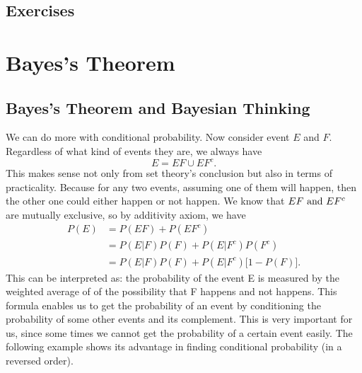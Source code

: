 	\subsection{Exercises}
	
	
\section{Bayes's Theorem}
\subsection{Bayes's Theorem and Bayesian Thinking}
        We can do more with conditional probability. Now consider event $E$ and $F$. Regardless of what kind of events they are, we always have 
        \[E = EF \cup EF^c.\]
        This makes sense not only from set theory's conclusion but also in terms of practicality. Because for any two events, assuming one of them will happen, then the other one could either happen or not happen.
        We know that \( EF \text{ and } EF^c\) are mutually exclusive, so by additivity axiom, we have 
        \begin{equation}
        	\begin{aligned}
        		P(E)& =P(EF) + P(EF^c) \\
        		&=P(E|F)P(F) + P(E|F^c)P(F^c) \\
        		&=P(E|F)P(F) + P(E|F^c)\bigl[1 - P(F)\bigr].
        	\end{aligned}
        \end{equation}
        This can be interpreted as: the probability of the event E is measured by the weighted average of of the possibility that F happens and not happens. This formula enables us to get the probability of an event by conditioning the probability of some other events and its complement.
        This is very important for us, since some times we cannot get the probability of a certain event easily. The following example shows its advantage in finding conditional probability (in a reversed order).
